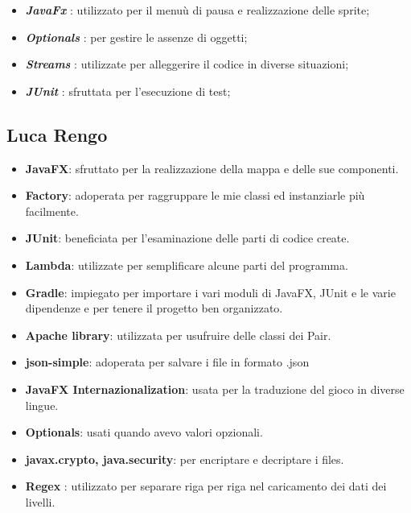 \begin{itemize}
    \item \textbf{\textit{JavaFx}} : utilizzato per il menuù di pausa e realizzazione delle sprite;
    \item \textbf{\textit{Optionals}} : per gestire le assenze di oggetti;
    \item \textbf{\textit{Streams}} : utilizzate per alleggerire il codice in diverse situazioni;
    \item \textbf{\textit{JUnit}} : sfruttata per l'esecuzione di test;
\end{itemize}

\subsection*{Luca Rengo}

\begin{itemize}
	\item \textsf{\small \textbf{JavaFX}: sfruttato per la realizzazione della mappa e delle sue componenti.}
	\item \textsf{\small \textbf{Factory}: adoperata per raggruppare le mie classi ed instanziarle più facilmente.}
	\item \textsf{\small \textbf{JUnit}: beneficiata per l'esaminazione delle parti di codice create.}
	\item \textsf{\small \textbf{Lambda}: utilizzate per semplificare alcune parti del programma.}
	\item \textsf{\small \textbf{Gradle}: impiegato per importare i vari moduli di JavaFX, JUnit e le varie dipendenze e per tenere il progetto ben organizzato.}
	\item \textsf{\small \textbf{Apache library}: utilizzata per usufruire delle classi dei Pair.}
	\item \textsf{\small \textbf{json-simple}: adoperata per salvare i file in formato .json}
	\item \textsf{\small \textbf{JavaFX Internazionalization}: usata per la traduzione del gioco in diverse lingue.}
	\item \textsf{\small \textbf{Optionals}: usati quando avevo valori opzionali.}
	\item \textsf{\small \textbf{javax.crypto, java.security}: per encriptare e decriptare i files.}
	\item \textsf{\small \textbf{Regex} : utilizzato per separare riga per riga nel caricamento dei dati dei livelli.}
\end{itemize}